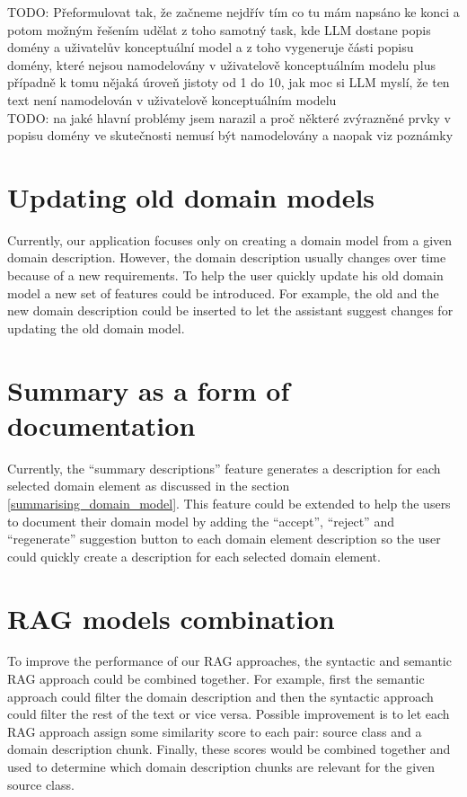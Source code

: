 \noindent{}TODO: Přeformulovat tak, že začneme nejdřív tím co tu mám napsáno ke konci a potom možným řešením udělat z toho samotný task, kde LLM dostane popis domény a uživatelův konceptuální model a z toho vygeneruje části popisu domény, které nejsou namodelovány v uživatelově konceptuálním modelu plus případně k tomu nějaká úroveň jistoty od 1 do 10, jak moc si LLM myslí, že ten text není namodelován v uživatelově konceptuálním modelu \\


\noindent{}TODO: na jaké hlavní problémy jsem narazil a proč některé zvýrazněné prvky v popisu domény ve skutečnosti nemusí být namodelovány a naopak viz poznámky


\section{Updating old domain models}

Currently, our application focuses only on creating a domain model from a given domain description. However, the domain description usually changes over time because of a new requirements. To help the user quickly update his old domain model a new set of features could be introduced. For example, the old and the new domain description could be inserted to let the assistant suggest changes for updating the old domain model.


\section{Summary as a form of documentation}

Currently, the ``summary descriptions'' feature generates a description for each selected domain element as discussed in the section \ref{summarising_domain_model}. This feature could be extended to help the users to document their domain model by adding the ``accept'', ``reject'' and ``regenerate'' suggestion button to each domain element description so the user could quickly create a description for each selected domain element.


\section{RAG models combination}

To improve the performance of our RAG approaches, the syntactic and semantic RAG approach could be combined together. For example, first the semantic approach could filter the domain description and then the syntactic approach could filter the rest of the text or vice versa. Possible improvement is to let each RAG approach assign some similarity score to each pair: source class and a domain description chunk. Finally, these scores would be combined together and used to determine which domain description chunks are relevant for the given source class.